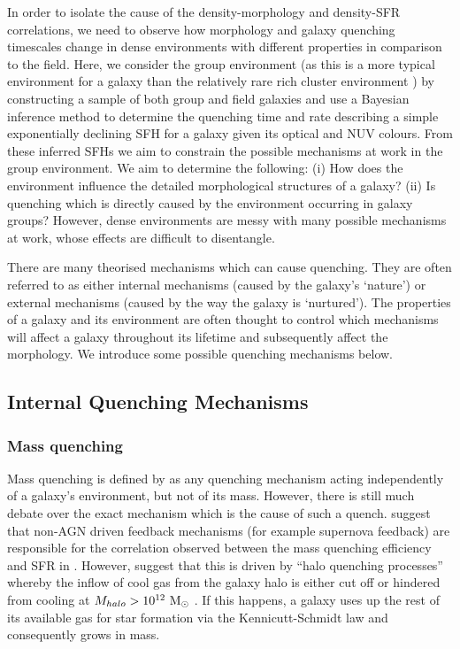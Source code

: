 \documentclass[useAMS,usenatbib]{mn2e}
\begin{document}
In order to isolate the cause of the density-morphology and density-SFR correlations, we need to observe how morphology and galaxy quenching timescales change in dense environments with different properties in comparison to the field. Here, we consider the group environment (as this is a more typical environment for a galaxy than the relatively rare rich cluster environment \citep{carlberg04}) by constructing a sample of both group and field galaxies and use a Bayesian inference method to determine the quenching time and rate describing a simple exponentially declining SFH for a galaxy given its optical and NUV colours. From these inferred SFHs we aim to constrain the possible mechanisms at work in the group environment. We aim to determine the following: (i) How does the environment influence the detailed morphological structures of a galaxy?  (ii) Is quenching which is directly caused by the environment occurring in galaxy groups? However, dense environments are messy with many possible mechanisms at work, whose effects are difficult to disentangle. 

There are many theorised mechanisms which can cause quenching. They are often referred to as either internal mechanisms (caused by the galaxy's `nature') or external mechanisms (caused by the way the galaxy is `nurtured'). The properties of a galaxy and its environment are often thought to control which mechanisms will affect a galaxy throughout its lifetime and subsequently affect the morphology. We introduce some possible quenching mechanisms below. 

\subsection{Internal Quenching Mechanisms}\label{sec:intquench}

\subsubsection{Mass quenching}\label{sec:massquench}

Mass quenching is defined by \citet{peng10, peng12} as any quenching mechanism acting independently of a galaxy's environment, but not of its mass. However, there is still much debate over the exact mechanism which is the cause of such a quench. \citet{darvish16} suggest that non-AGN driven feedback mechanisms (for example supernova feedback) are responsible for the correlation observed between the mass quenching efficiency and SFR in \citet{peng10}. However, \citet{gabor15} suggest that this is driven by ``halo quenching processes'' whereby the inflow of cool gas from the galaxy halo is either cut off or hindered from cooling at $M_{halo} > 10^{12}~\rm{M}_{\odot}$ \citep{birnboim03, dekel06}. If this happens, a galaxy uses up the rest of its available gas for star formation via the Kennicutt-Schmidt law \citep{schmidt59, kennicutt98} and consequently grows in mass.
\end{document}
